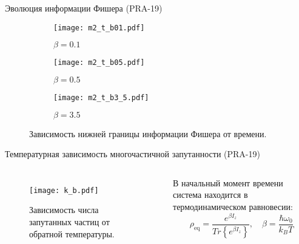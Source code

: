 \begin{frame}{Эволюция информации Фишера (PRA-19)}
  \begin{figure}
    \begin{subfigure}[t]{0.3\textwidth}
      \texttt{[image: m2\_t\_b01.pdf]}
      \caption{$\beta = 0.1$}
    \end{subfigure}
    \begin{subfigure}[t]{0.3\textwidth}
      \texttt{[image: m2\_t\_b05.pdf]}
      \caption{$\beta = 0.5$}
    \end{subfigure}
    \begin{subfigure}[t]{0.3\textwidth}
      \texttt{[image: m2\_t\_b3\_5.pdf]}
      \caption{$\beta = 3.5$}
    \end{subfigure}
    \caption{Зависимость нижней границы информации Фишера от времени.}
  \end{figure}
\end{frame}


\begin{frame}{Температурная зависимость многочастичной запутанности (PRA-19)}
\begin{columns}
    \begin{figure}
    \texttt{[image: k\_b.pdf]}
    \caption{Зависимость числа запутанных частиц от обратной температуры.}
    \end{figure}


    В начальный момент времени система находится в термодинамическом равновесии:
    $$
    \rho_\mathrm{eq} = \dfrac{ e^{\beta I_z} }{Tr \left\{ e^{\beta I_z} \right\} },
    \quad
    \beta = \dfrac{\hbar \omega_0}{k_{B} T}
    $$
\end{columns}
\end{frame}


